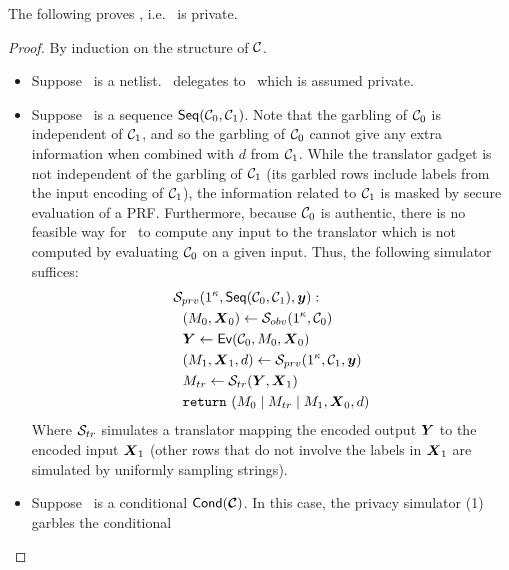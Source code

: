 The following proves , i.e. \ourschemelong\ is
private.
\begin{proof}
  By induction on the structure of $\mathcal C$.
  \begin{itemize}
    \item Suppose \cir\ is a netlist. \ourschemelong\ delegates to
      \underscheme\ which is assumed private.
    \item Suppose \cir\ is a sequence $\textsf{Seq}(\mathcal C_0, \mathcal C_1)$.
      Note that the garbling of $\mathcal C_0$ is independent of
      $\mathcal C_1$, and so the garbling of $\mathcal C_0$ cannot give any extra information when combined
      with $d$ from $\mathcal C_1$.
      While the translator gadget is not independent of the garbling
      of $\mathcal C_1$ (its garbled rows include labels from the input
      encoding of $\mathcal C_1$), the information related to $\mathcal C_1$ is
      masked by secure evaluation of a PRF.
      Furthermore, because $\mathcal C_0$ is authentic, there is no feasible
      way for \adv\ to compute any input to the translator which is
      not computed by evaluating $\mathcal C_0$ on a given input.
      Thus, the following simulator suffices:
      \begin{align*}
        &\simulator_{prv}(1^\kappa, \sequential(\cir_0, \cir_1), \cirout):\\
        &~~(\mat_0, \gcirinp_0) \gets \simulator_{obv}(1^\kappa, \cir_0)\\
        &~~\gcirout \gets \gEv(\cir_0, \mat_0, \gcirinp_0)\\
        &~~(\mat_1, \gcirinp_1, d) \gets \simulator_{prv}(1^\kappa, \cir_1, \cirout)\\
        &~~\mat_{tr} \gets \simulator_{tr}(\gcirout, \gcirinp_1)\\
        &~~\creturn~(\mat_0 \mid \mat_{tr} \mid \mat_1, \gcirinp_0, d)
      \end{align*}
      Where $\mathcal{S}_{tr}$ simulates a translator
      mapping the encoded output $\gcirout$ to the encoded input
      $\gcirinp_1$ (other rows that do not involve the labels in
      $\gcirinp_1$ are simulated by uniformly sampling strings).
    \item Suppose \cir\ is a conditional $\conditional(\vec \cir)$.
      In this case, the privacy simulator (1) garbles the conditional

\end{itemize}
\end{proof}
